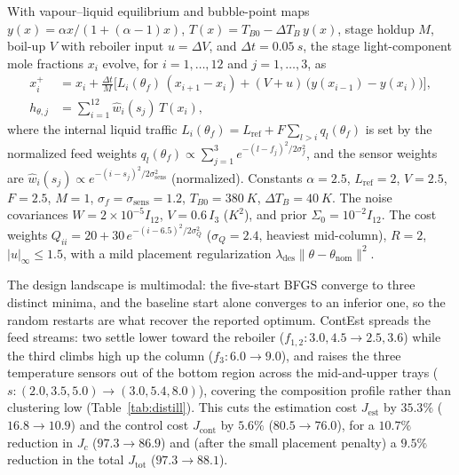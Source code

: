 \documentclass[twocolumn,amsthm]{autart}
\begin{document}
With vapour--liquid equilibrium and bubble-point maps
$y(x)=\alpha x/(1+(\alpha-1)x)$, $T(x)=T_{B0}-\Delta T_B\,y(x)$, stage holdup
$M$, boil-up $V$ with reboiler input $u=\Delta V$, and $\Delta t=\SI{0.05}{s}$,
the stage light-component mole fractions $x_i$ evolve, for $i=1,\dots,12$ and
$j=1,\dots,3$, as
\begin{subequations}\label{eq:distill-model}
\begin{align}
x_i^{+} &= x_i + \tfrac{\Delta t}{M}\Big[L_i(\theta_f)\,(x_{i+1}-x_i)
   + (V+u)\,\big(y(x_{i-1})-y(x_i)\big)\Big],\\
h_{\theta,j} &= \textstyle\sum_{i=1}^{12}\hat w_i(s_j)\,T(x_i),
\end{align}
\end{subequations}
where the internal liquid traffic
$L_i(\theta_f)=L_{\mathrm{ref}}+F\sum_{l>i}q_l(\theta_f)$ is set by the
normalized feed weights $q_l(\theta_f)\propto \sum_{j=1}^{3}e^{-(l-f_j)^2/2\sigma_f^2}$,
and the sensor weights are
$\hat w_i(s_j)\propto e^{-(i-s_j)^2/2\sigma_{\mathrm{sens}}^2}$ (normalized).
Constants $\alpha=2.5$,
$L_{\mathrm{ref}}=2$, $V=2.5$, $F=2.5$, $M=1$,
$\sigma_f=\sigma_{\mathrm{sens}}=1.2$, $T_{B0}=\SI{380}{K}$,
$\Delta T_B=\SI{40}{K}$. The noise covariances $W=2\!\times\!10^{-5}I_{12}$,
$V=0.6\,I_3$ ($\si{K^2}$), and prior $\Sigma_0=10^{-2}I_{12}$. The cost weights
$Q_{ii}=20+30\,e^{-(i-6.5)^2/2\sigma_Q^2}$ ($\sigma_Q=2.4$, heaviest
mid-column), $R=2$,
$|u|_\infty\le1.5$, with a mild placement regularization
$\lambda_{\mathrm{des}}\lVert\theta-\theta_{\mathrm{nom}}\rVert^2$.

The design landscape is multimodal: the five-start BFGS converge to three distinct
minima, and the baseline start alone converges to an inferior one, so the random
restarts are what recover the reported optimum. ContEst spreads the feed
streams: two settle lower toward the reboiler ($f_{1,2}:3.0,4.5\to2.5,3.6$) while
the third climbs high up the column ($f_3:6.0\to9.0$), and raises the three
temperature sensors out of the bottom region across the mid-and-upper trays
($s:(2.0,3.5,5.0)\to(3.0,5.4,8.0)$), covering the composition profile rather than
clustering low (Table~\ref{tab:distill}). This cuts the estimation cost
$J_{\mathrm{est}}$ by $35.3\%$ ($16.8\to10.9$) and the control cost
$J_{\mathrm{cont}}$ by $5.6\%$ ($80.5\to76.0$), for a $10.7\%$ reduction in $J_c$
($97.3\to86.9$) and (after the small placement penalty) a $9.5\%$ reduction in the
total $J_{\mathrm{tot}}$ ($97.3\to88.1$).
\end{document}
